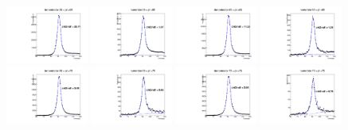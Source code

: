 \documentclass[thesis.tex]{subfiles}
\renewcommand\_{\textunderscore\allowbreak}
\begin{document}
\begin{figure}
   \includegraphics[width=0.24\textwidth]{Figures/Bw_ker_pt_den_55_60.pdf}  \includegraphics[width=0.24\textwidth]{Figures/Bw_ker_pt_num_55_60.pdf}   \includegraphics[width=0.24\textwidth]{Figures/Bw_ker_pt_den_60_65.pdf} \includegraphics[width=0.24\textwidth]{Figures/Bw_ker_pt_num_60_65.pdf} \\
   \includegraphics[width=0.24\textwidth]{Figures/Bw_ker_pt_den_65_70.pdf}  \includegraphics[width=0.24\textwidth]{Figures/Bw_ker_pt_num_65_70.pdf}   \includegraphics[width=0.24\textwidth]{Figures/Bw_ker_pt_den_70_75.pdf} \includegraphics[width=0.24\textwidth]{Figures/Bw_ker_pt_num_70_75.pdf} \\

\end{figure}
\end{document}
